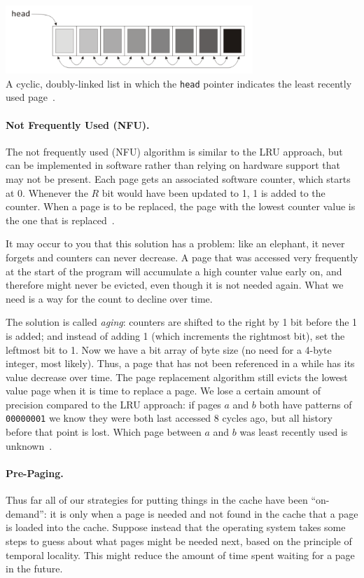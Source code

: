 \begin{center}
\includegraphics[width=0.7\textwidth]{images/lru-linkedlist.png}\\
A cyclic, doubly-linked list in which the \texttt{head} pointer indicates the least recently used page~\cite{mte241}.
\end{center}

\paragraph{Not Frequently Used (NFU).}
The not frequently used (NFU) algorithm is similar to the LRU approach, but can be implemented in software rather than relying on hardware support that may not be present. Each page gets an associated software counter, which starts at 0. Whenever the $R$ bit would have been updated to 1, 1 is added to the counter. When a page is to be replaced, the page with the lowest counter value is the one that is replaced~\cite{mos}. 

It may occur to you that this solution has a problem: like an elephant, it never forgets and counters can never decrease. A page that was accessed very frequently at the start of the program will accumulate a high counter value early on, and therefore might never be evicted, even though it is not needed again. What we need is a way for the count to decline over time. 

The solution is called \textit{aging}: counters are shifted to the right by 1 bit before the 1 is added; and instead of adding 1 (which increments the rightmost bit), set the leftmost bit to 1. Now we have a bit array of byte size (no need for a 4-byte integer, most likely). Thus, a page that has not been referenced in a while has its value decrease over time. The page replacement algorithm still evicts the lowest value page when it is time to replace a page. We lose a certain amount of precision compared to the LRU approach: if pages $a$ and $b$ both have patterns of \texttt{00000001} we know they were both last accessed 8 cycles ago, but all history before that point is lost. Which page between $a$ and $b$ was least recently used is unknown~\cite{mos}. 

\paragraph{Pre-Paging.}
Thus far all of our strategies for putting things in the cache have been ``on-demand'': it is only when a page is needed and not found in the cache that a page is loaded into the cache. Suppose instead that the operating system takes some steps to guess about what pages might be needed next, based on the principle of temporal locality. This might reduce the amount of time spent waiting for a page in the future.

